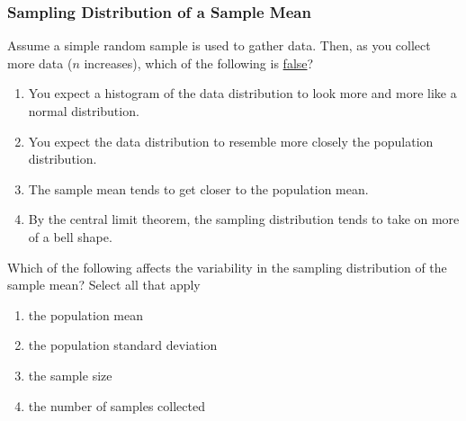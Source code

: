 \begin{frame}
\frametitle{Sampling Distribution of a Sample Mean}
\end{frame}


\begin{frame}
\begin{clicker}{Assume a simple random sample is used to gather data.  Then, as you collect more data ($n$ increases), which of the following is \underline{false}? }
\begin{enumerate}
    \item
    You expect a histogram of the data distribution to look more and more like a normal distribution.
    \item
    You expect the data distribution to resemble more closely the population distribution.
    \item
    The sample mean tends to get closer to the population mean.
    \item
    By the central limit theorem, the sampling distribution tends to take on more of a bell shape.
\end{enumerate}
\end{clicker}
\end{frame}

\begin{frame}
\begin{clicker}{Which of the following affects the variability in the sampling distribution of the sample mean?  Select all that apply}
\begin{enumerate}
    \item
    the population mean
    \item
    the population standard deviation
    \item
    the sample size
    \item
    the number of samples collected
\end{enumerate}
\end{clicker}
\end{frame}

